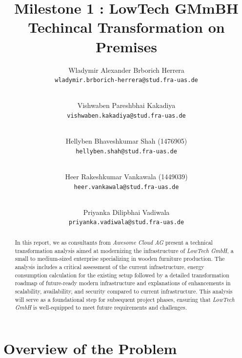 \documentclass{llncs}
\newcommand{\what}{Milestone 1 : LowTech GMmBH Techincal Transformation on Premises}
\begin{document}
%
%
%
\mainmatter              %
%
\title{\what}
%
\author{
  Wladymir Alexander Brborich Herrera\\
  \texttt{wladymir.brborich-herrera@stud.fra-uas.de}
  \and\\ 
  Vishwaben Pareshbhai Kakadiya\\
  \texttt{vishwaben.kakadiya@stud.fra-uas.de}
  \and\\
  Hellyben Bhaveshkumar Shah (1476905)\\
  \texttt{hellyben.shah@stud.fra-uas.de}
  \and\\
  Heer Rakeshkumar Vankawala (1449039)
  \\
  \texttt{heer.vankawala@stud.fra-uas.de}
  \and\\
  Priyanka Dilipbhai Vadiwala\\
  \texttt{priyanka.vadiwala@stud.fra-uas.de}
}
%

\maketitle              %

\begin{abstract}
  In this report, we as consultants from \textit{Awesome Cloud AG} present a technical transformation analysis aimed at modernizing the infrastructure of \textit{LowTech GmbH}, 
  a small to medium-sized enterprise specializing in wooden furniture production. 
  The analysis includes a critical assessment of the current infrastructure, energy consumption calculation for the existing setup 
  followed by a detailed transformation roadmap of future-ready modern infrastructure and explanations of enhancements in scalability, availability, and security compared to current infrastructure. 
  This analysis will serve as a foundational step for subsequent project phases, ensuring that \textit{LowTech GmbH} is well-equipped to meet future requirements and challenges.
\end{abstract}

\section{Overview of the Problem}
\end{document}
